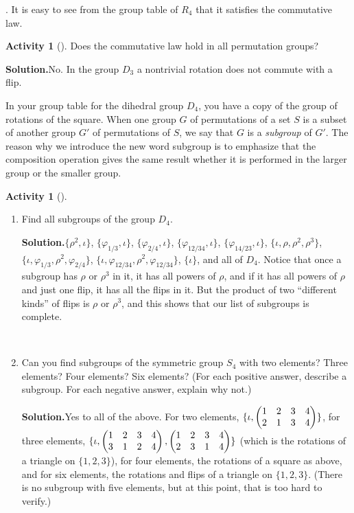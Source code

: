 \documentclass[10pt,]{book}
\theoremstyle{plain}
\theoremstyle{definition}
\newtheorem{activity}[project]{Activity}
\numberwithin{equation}{chapter}
\newcommand{\amp}{&}
\begin{document}
\varphi\circ\sigma\). It is easy to see from the group table of \(R_4\) that it satisfies the commutative law.%
\begin{activity}[]\label{activity-266}
Does the commutative law hold in all permutation groups?%
\par\medskip\noindent%
\textbf{Solution.}\quad No. In the group \(D_3\) a nontrivial rotation does not commute with a flip.%
\end{activity}
In your group table for the dihedral group \(D_4\), you have a copy of the group of rotations of the square. When one group \(G\) of permutations of a set \(S\) is a subset of another group \(G'\) of permutations of \(S\), we say that \(G\) is a \emph{subgroup} of \(G'\). The reason why we introduce the new word subgroup is to emphasize that the composition operation gives the same result whether it is performed in the larger group or the smaller group.%
\begin{activity}[]\label{S4}
~\par
\begin{enumerate}[label=(\alph*)]
 \item Find all subgroups of the group \(D_4\).%
\par\medskip\noindent%
\textbf{Solution.}\quad \(\{\rho^2,\!\iota\}\), \(\{\varphi_{1/3},\!\iota\}\), \(\{\varphi_{2/4},\!\iota\}\), \(\{\varphi_{12/34},\!\iota\}\), \(\{\varphi_{14/23},\!\iota\}\), \(\{\iota,\rho,\rho^2,\rho^3\}\), \(\{\iota,\varphi_{1/3},\rho^2,\varphi_{2/4}\}\), \(\{\iota,\varphi_{12/34},\rho^2,\varphi_{12/34}\}\), \(\{\iota\}\), and all of \(D_4\). Notice that once a subgroup has \(\rho\) or \(\rho^3\) in it, it has all powers of \(\rho\), and if it has all powers of \(\rho\) and just one flip, it has all the flips in it. But the product of two ``different kinds'' of flips is \(\rho\) or \(\rho^3\), and this shows that our list of subgroups is complete.%

~\par
\item Can you find subgroups of the symmetric group \(S_4\) with two elements? Three elements? Four elements? Six elements? (For each positive answer, describe a subgroup. For each negative answer, explain why not.)%
\par\medskip\noindent%
\textbf{Solution.}\quad Yes to all of the above. For two elements, \(\{\iota,\begin{pmatrix}1\amp 2\amp 3\amp 4\cr2\amp 1\amp 3\amp 4
\end{pmatrix} \}\), for three elements, \(\{\iota,\begin{pmatrix}1\amp 2\amp 3\amp 4\cr3\amp 1\amp 2\amp 4
\end{pmatrix} , \begin{pmatrix}1\amp 2\amp 3\amp 4\cr2\amp 3\amp 1\amp 4
\end{pmatrix} \}\) (which is the rotations of a triangle on \(\{1,2,3\}\)), for four elements, the rotations of a square as above, and for six elements, the rotations and flips of a triangle on \(\{1,2,3\}\). (There is no subgroup with five elements, but at this point, that is too hard to verify.)%

\end{enumerate}
\end{activity}
\end{document}
